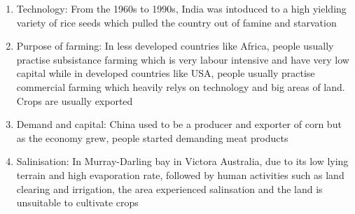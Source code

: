 \documentclass[oneside]{book}
\begin{document}
\begin{minipage}{0.5\textwidth}
\begin{enumerate}
    \item Technology: From the 1960s to 1990s, India was intoduced to a high yielding variety of rice seeds which pulled the country out of famine and starvation
    
    \item Purpose of farming: In less developed countries like Africa, people usually practise subsistance farming which is very labour intensive and have very low capital while in developed countries like USA, people usually practise commercial farming which heavily relys on technology and big areas of land. Crops are usually exported
    
    \item Demand and capital: China used to be a producer and exporter of corn but as the economy grew, people started demanding meat products
    
    \item Salinisation: In Murray-Darling bay in Victora Australia, due to its low lying terrain and high evaporation rate, followed by human activities such as land clearing and irrigation, the area experienced salinsation and the land is unsuitable to cultivate crops
  \end{enumerate}
\end{minipage}
\end{document}
